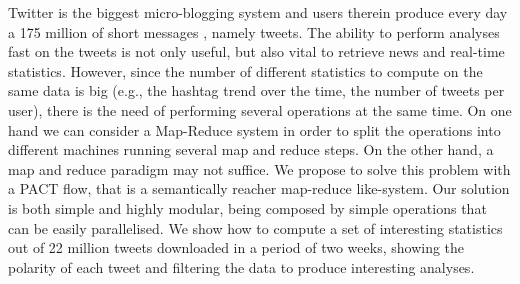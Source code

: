 Twitter is the biggest micro-blogging system and users therein produce every day a 175 million of short messages
, namely tweets.
The ability to perform analyses fast on the tweets is not only useful, but also vital to retrieve news and real-time statistics. 
However, since the number of different statistics to compute on the same data is big (e.g., the hashtag trend over the time, the number of tweets per user), there is the need of performing several operations at the same time. 
On one hand we can consider a Map-Reduce system in order to split the operations into different machines running several map and reduce steps.
On the other hand, a map and reduce paradigm may not suffice. 
We propose to solve this problem with a PACT flow, that is a semantically reacher map-reduce like-system.
Our solution is both simple and highly modular, being composed by simple operations that can be easily parallelised. 
We show how to compute a set of interesting statistics out of 22 million tweets downloaded in a period of two weeks, showing the polarity of each tweet and filtering the data to produce interesting analyses. 


